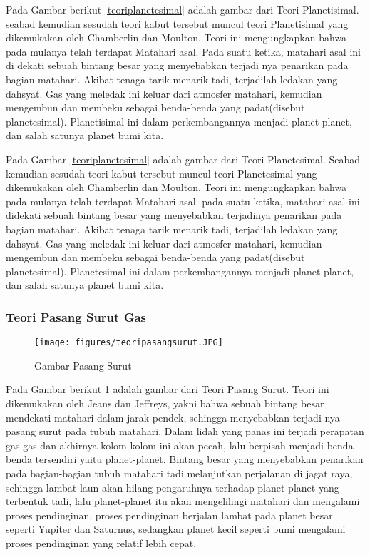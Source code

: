 	Pada Gambar berikut \ref{teoriplanetesimal} adalah gambar dari Teori Planetisimal.
seabad kemudian sesudah teori kabut tersebut muncul teori Planetisimal yang dikemukakan oleh Chamberlin dan Moulton. Teori ini mengungkapkan bahwa pada mulanya telah terdapat Matahari asal. Pada suatu ketika, matahari asal ini di dekati sebuah bintang besar yang menyebabkan terjadi nya penarikan pada bagian matahari. Akibat tenaga tarik menarik tadi, terjadilah ledakan yang dahsyat. Gas yang meledak ini keluar dari atmosfer matahari, kemudian mengembun dan membeku sebagai benda-benda yang padat(disebut planetesimal). Planetisimal ini dalam perkembangannya menjadi planet-planet, dan salah satunya planet bumi kita.


Pada Gambar \ref{teoriplanetesimal} adalah gambar dari Teori Planetesimal. Seabad kemudian sesudah teori kabut tersebut muncul teori Planetesimal yang dikemukakan oleh Chamberlin dan Moulton. Teori ini mengungkapkan bahwa pada mulanya telah terdapat Matahari asal. pada suatu ketika, matahari asal ini didekati sebuah bintang besar yang menyebabkan terjadinya penarikan pada bagian matahari. Akibat tenaga tarik menarik tadi, terjadilah ledakan yang dahsyat. Gas yang meledak ini keluar dari atmosfer matahari, kemudian mengembun dan membeku sebagai benda-benda yang padat(disebut planetesimal). Planetesimal ini dalam perkembangannya menjadi planet-planet, dan salah satunya planet bumi kita.

\subsubsection{Teori Pasang Surut Gas}
\begin{figure} [ht]
	\centerline{\texttt{[image: figures/teoripasangsurut.JPG]}}
	\caption{Gambar Pasang Surut}
	\label{teoripasangsurut}
	\end{figure}

	Pada Gambar berikut \ref{teoripasangsurut} adalah gambar dari Teori Pasang Surut.
Teori ini dikemukakan oleh Jeans dan Jeffreys, yakni bahwa sebuah bintang besar mendekati matahari dalam jarak pendek, sehingga menyebabkan terjadi nya pasang surut pada tubuh matahari. Dalam lidah yang panas ini terjadi perapatan gas-gas dan akhirnya kolom-kolom ini akan pecah, lalu berpisah menjadi benda-benda tersendiri yaitu planet-planet. Bintang besar yang menyebabkan penarikan pada bagian-bagian tubuh matahari tadi melanjutkan perjalanan di jagat raya, sehingga lambat laun akan hilang pengaruhnya terhadap planet-planet yang terbentuk tadi, lalu planet-planet itu akan mengelilingi matahari dan mengalami proses pendinginan, proses pendinginan berjalan lambat pada planet besar seperti Yupiter dan Saturnus, sedangkan planet kecil seperti bumi mengalami proses pendinginan yang relatif lebih cepat.


